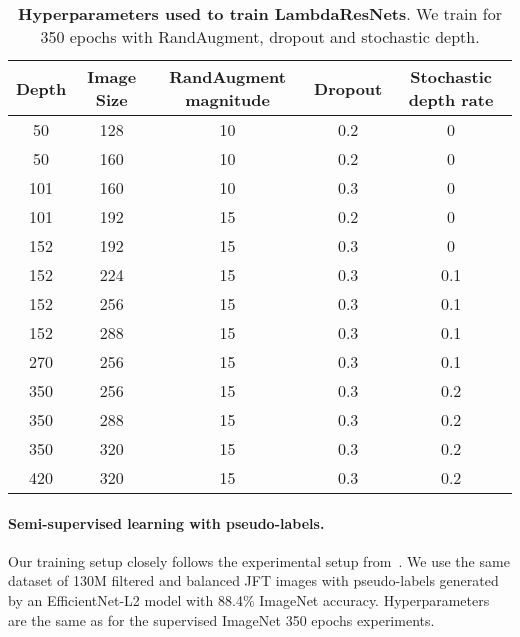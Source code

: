 \documentclass{article} \usepackage{iclr2021_conference,times}
\begin{document}
\begin{table}[h!]
\begin{center}
\begin{tabular}{cc|ccc}
    \toprule
    Depth & Image Size & RandAugment magnitude & Dropout & Stochastic depth rate \\
    \midrule
    50 & 128 & 10 & 0.2 & 0 \\
    50 & 160 & 10 & 0.2 & 0 \\
    101 & 160 & 10 & 0.3 & 0 \\
    101 & 192 & 15 & 0.2 & 0 \\
    152 & 192 & 15 & 0.3 & 0 \\
    152 & 224 & 15 & 0.3 & 0.1 \\
    152 & 256 & 15 & 0.3 & 0.1 \\
    152 & 288 & 15 & 0.3 & 0.1 \\
    270 & 256 & 15 & 0.3 & 0.1 \\
    350 & 256 & 15 & 0.3 & 0.2 \\
    350 & 288 & 15 & 0.3 & 0.2 \\
    350 & 320 & 15 & 0.3 & 0.2 \\
    420 & 320 & 15 & 0.3 & 0.2 \\
    \bottomrule
\end{tabular}
\end{center}
\caption{
\textbf{Hyperparameters used to train LambdaResNets}. We train for 350 epochs with RandAugment, dropout and stochastic depth.}
\label{tab:pareto_curve_hparams} 
\end{table}

\vspace{-0.1cm}
\paragraph{Semi-supervised learning with pseudo-labels.}
Our training setup closely follows the experimental setup from~\cite{xie2020selftraining}.
We use the same dataset of 130M filtered and balanced JFT images with pseudo-labels generated by an EfficientNet-L2 model with 88.4\% ImageNet accuracy.
Hyperparameters are the same as for the supervised ImageNet 350 epochs experiments.

\vspace{-0.1cm}
\end{document}

